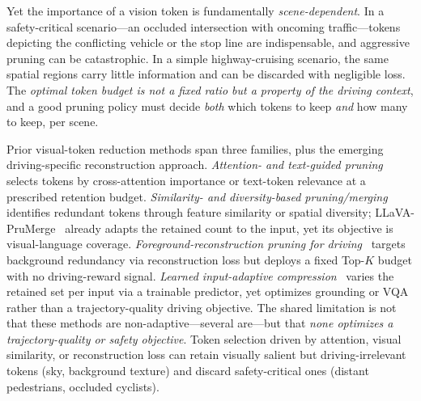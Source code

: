 \documentclass[letterpaper]{article} %
\begin{document}
Yet the importance of a vision token is fundamentally \emph{scene-dependent}.
In a safety-critical scenario---an occluded intersection with oncoming
traffic---tokens depicting the conflicting vehicle or the stop line are
indispensable, and aggressive pruning can be catastrophic.
In a simple highway-cruising scenario, the same spatial regions carry little
information and can be discarded with negligible loss.
The \emph{optimal token budget is not a fixed ratio but a property of the
driving context}, and a good pruning policy must decide \emph{both} which
tokens to keep \emph{and} how many to keep, per scene.

Prior visual-token reduction methods span three families, plus the emerging
driving-specific reconstruction approach.
\emph{Attention- and text-guided pruning}~\citep{chen2024fastv,xu2024sparsevlm}
selects tokens by cross-attention importance or text-token relevance at a
prescribed retention budget.
\emph{Similarity- and diversity-based pruning/merging}~\citep{shang2024llavaprumerge,topv2025,visionzip2025}
identifies redundant tokens through feature similarity or spatial diversity;
LLaVA-PruMerge~\citep{shang2024llavaprumerge} already adapts the retained
count to the input, yet its objective is visual-language coverage.
\emph{Foreground-reconstruction pruning for driving}~\citep{fastdrivevla2026}
targets background redundancy via reconstruction loss but deploys a fixed
Top-$K$ budget with no driving-reward signal.
\emph{Learned input-adaptive compression}~\citep{atpllava2025,glimpseprune2025}
varies the retained set per input via a trainable predictor, yet optimizes
grounding or VQA rather than a trajectory-quality driving objective.
The shared limitation is not that these methods are non-adaptive---several
are---but that \emph{none optimizes a trajectory-quality or safety objective}.
Token selection driven by attention, visual similarity, or reconstruction loss
can retain visually salient but driving-irrelevant tokens (sky, background
texture) and discard safety-critical ones (distant pedestrians, occluded
cyclists).
\end{document}
